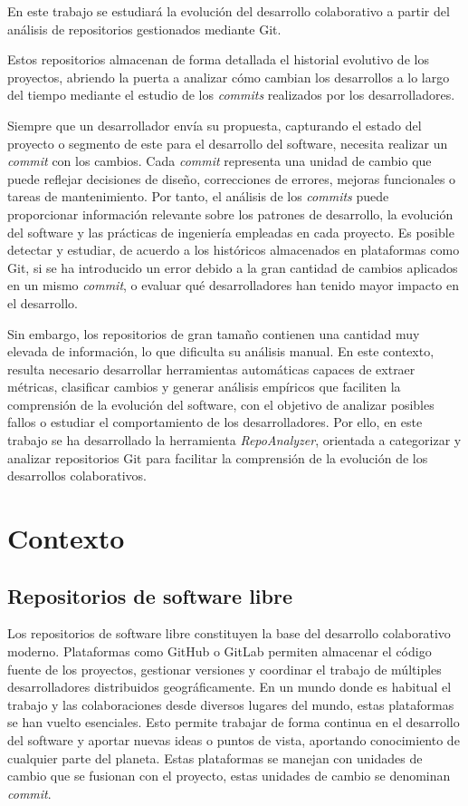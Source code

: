 \documentclass[a4paper, 12pt]{book}
\begin{document}
En este trabajo se estudiará la evolución del desarrollo colaborativo a partir del análisis de repositorios gestionados mediante Git.

Estos repositorios almacenan de forma detallada el historial evolutivo de los proyectos, abriendo la puerta a analizar cómo cambian los desarrollos a lo largo del tiempo mediante el estudio de los \emph{commits} realizados por los desarrolladores.

Siempre que un desarrollador envía su propuesta, capturando el estado del proyecto o segmento de este para el desarrollo del software, necesita realizar un \emph{commit} con los cambios. Cada \emph{commit} representa una unidad de cambio que puede reflejar decisiones de diseño, correcciones de errores, mejoras funcionales o tareas de mantenimiento. Por tanto, el análisis de los \emph{commits} puede proporcionar información relevante sobre los patrones de desarrollo, la evolución del software y las prácticas de ingeniería empleadas en cada proyecto. Es posible detectar y estudiar, de acuerdo a los históricos almacenados en plataformas como Git, si se ha introducido un error debido a la gran cantidad de cambios aplicados en un mismo \emph{commit}, o evaluar qué desarrolladores han tenido mayor impacto en el desarrollo.

Sin embargo, los repositorios de gran tamaño contienen una cantidad muy elevada de información, lo que dificulta su análisis manual. En este contexto, resulta necesario desarrollar herramientas automáticas capaces de extraer métricas, clasificar cambios y generar análisis empíricos que faciliten la comprensión de la evolución del software, con el objetivo de analizar posibles fallos o estudiar el comportamiento de los desarrolladores. Por ello, en este trabajo se ha desarrollado la herramienta \emph{RepoAnalyzer}, orientada a categorizar y analizar repositorios Git para facilitar la comprensión de la evolución de los desarrollos colaborativos.


\section{Contexto}
\label{sec:contexto}

\subsection{Repositorios de software libre}
\label{subsec:repositorios}

Los repositorios de software libre constituyen la base del desarrollo colaborativo moderno. Plataformas como GitHub o GitLab permiten almacenar el código fuente de los proyectos, gestionar versiones y coordinar el trabajo de múltiples desarrolladores distribuidos geográficamente. En un mundo donde es habitual el trabajo y las colaboraciones desde diversos lugares del mundo, estas plataformas se han vuelto esenciales. Esto permite trabajar de forma continua en el desarrollo del software y aportar nuevas ideas o puntos de vista, aportando conocimiento de cualquier parte del planeta. Estas plataformas se manejan con unidades de cambio que se fusionan con el proyecto, estas unidades de cambio se denominan \emph{commit}.
\end{document}
